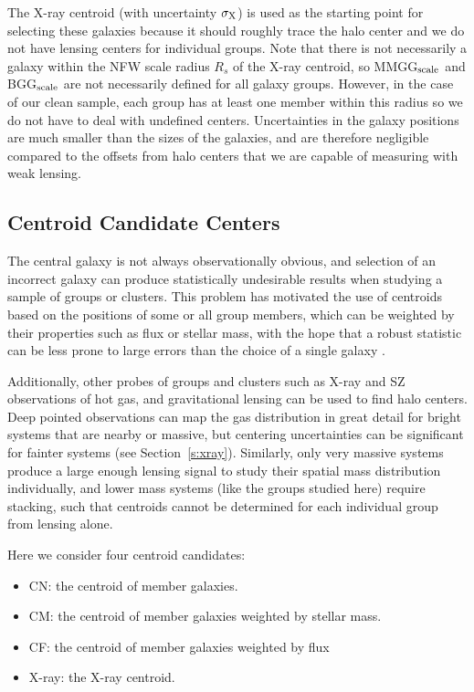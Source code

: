 \documentclass[12pt]{emulateapj}
\begin{document}
The X-ray centroid (with uncertainty $\sigma_{\rm X}$) is used as the starting point for selecting these
galaxies because it should roughly trace the halo center and we do not
have lensing centers for individual groups. Note that there is not
necessarily a galaxy within the NFW scale radius $R_s$ of the X-ray
centroid, so MMGG$_{\rm scale}$ and BGG$_{\rm scale}$ are not
necessarily defined for all galaxy groups. However, in the case of our
clean sample, each group has at least one member within this radius so
we do not have to deal with undefined centers. Uncertainties in the
galaxy positions are much smaller than the sizes of the galaxies, and
are therefore negligible compared to the offsets from halo centers
that we are capable of measuring with weak lensing.

\subsection{Centroid Candidate Centers}

The central galaxy is not always observationally obvious, and
selection of an incorrect galaxy can produce statistically undesirable
results when studying a sample of groups or clusters. This problem has
motivated the use of centroids based on the positions of some or all
group members, which can be weighted by their properties such as flux
or stellar mass, with the hope that a robust statistic can be less
prone to large errors than the choice of a single galaxy
\citep[e.g.,][]{White1999, Carlberg2001, Berlind2006, Jee2011}.

Additionally, other probes of groups and clusters such as X-ray and SZ
\citep{Sunyaev1972} 
observations of hot gas, and gravitational lensing can be used to find
halo centers. Deep pointed observations can map the gas distribution
in great detail for bright systems that are nearby or massive, but
centering uncertainties can be significant for fainter systems (see
Section~\ref{s:xray}). Similarly, only very massive systems produce a
large enough lensing signal to study their spatial mass distribution
individually, and lower mass systems (like the groups studied here)
require stacking, such that centroids cannot be determined for each
individual group from lensing alone.

Here we consider four centroid candidates:
\begin{itemize}
\item CN: the centroid of member galaxies.
\item CM: the centroid of member galaxies weighted by stellar mass.
\item CF: the centroid of member galaxies weighted by flux
\item X-ray: the X-ray centroid.
\end{itemize}
\end{document}
